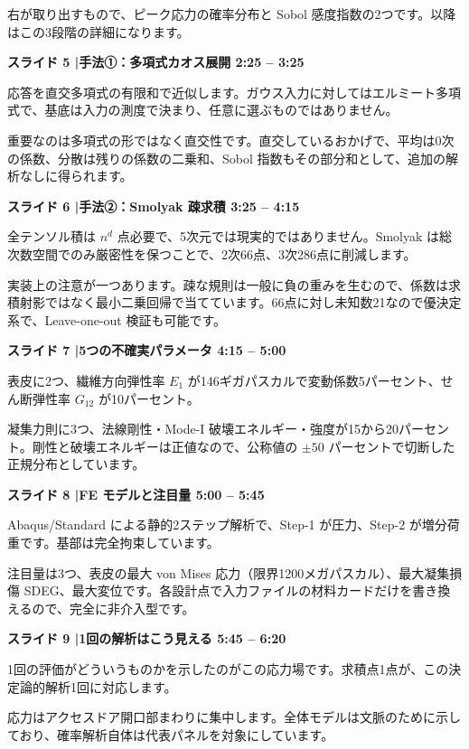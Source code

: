 \documentclass[11pt,a4paper]{ltjsarticle}
\newcommand{\slide}[3]{%
  \medskip
  \noindent\colorbox{luhblue}{\parbox{\dimexpr\linewidth-2\fboxsep}{%
    \color{white}\bfseries\small スライド #1 \quad|\quad #2 \hfill #3}}\par
  \nopagebreak\vspace{0.25em}}
\begin{document}
右が取り出すもので、ピーク応力の確率分布と Sobol 感度指数の2つです。以降はこの3段階の詳細になります。

\slide{5}{手法①：多項式カオス展開}{2:25 -- 3:25}

応答を直交多項式の有限和で近似します。ガウス入力に対してはエルミート多項式で、基底は入力の測度で決まり、任意に選ぶものではありません。

重要なのは多項式の形ではなく直交性です。直交しているおかげで、平均は0次の係数、分散は残りの係数の二乗和、Sobol 指数もその部分和として、追加の解析なしに得られます。

\slide{6}{手法②：Smolyak 疎求積}{3:25 -- 4:15}

全テンソル積は $n^d$ 点必要で、5次元では現実的ではありません。Smolyak は総次数空間でのみ厳密性を保つことで、2次66点、3次286点に削減します。

実装上の注意が一つあります。疎な規則は一般に負の重みを生むので、係数は求積射影ではなく最小二乗回帰で当てています。66点に対し未知数21なので優決定系で、Leave-one-out 検証も可能です。

\slide{7}{5つの不確実パラメータ}{4:15 -- 5:00}

表皮に2つ、繊維方向弾性率 $E_1$ が146ギガパスカルで変動係数5パーセント、せん断弾性率 $G_{12}$ が10パーセント。

凝集力則に3つ、法線剛性・Mode-I 破壊エネルギー・強度が15から20パーセント。剛性と破壊エネルギーは正値なので、公称値の $\pm50$ パーセントで切断した正規分布としています。

\slide{8}{FE モデルと注目量}{5:00 -- 5:45}

Abaqus/Standard による静的2ステップ解析で、Step-1 が圧力、Step-2 が増分荷重です。基部は完全拘束しています。

注目量は3つ、表皮の最大 von Mises 応力（限界1200メガパスカル）、最大凝集損傷 SDEG、最大変位です。各設計点で入力ファイルの材料カードだけを書き換えるので、完全に非介入型です。

\slide{9}{1回の解析はこう見える}{5:45 -- 6:20}

1回の評価がどういうものかを示したのがこの応力場です。求積点1点が、この決定論的解析1回に対応します。

応力はアクセスドア開口部まわりに集中します。全体モデルは文脈のために示しており、確率解析自体は代表パネルを対象にしています。
\end{document}
